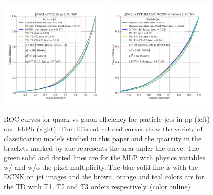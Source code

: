 \documentclass[notoc]{JHEP3}
\begin{document}
\begin{figure}[t]
	\centering
	\includegraphics[width=0.49\textwidth]{plots/JEWELPYTHIA_pp_2p76TeV_genLevel_QvsG.pdf}
	\includegraphics[width=0.49\textwidth]{plots/JEWELPYTHIA_PbPb_2p76TeV_genLevel_QvsG.pdf}
	\caption{ROC curves for quark vs gluon efficiency for particle jets in pp (left) and PbPb (right). The different colored curves show the variety of classification models studied in this paper and the quantity in the brackets marked by auc represents the area under the curve. The green solid and dotted lines are for the MLP with physics variables w/ and w/o the pixel multiplicity. The blue solid line is with the DCNN on jet images and the brown, orange and teal colors are for the TD with T1, T2 and T3 orders respectively. (color online)}
\label{fig:ROC_all}
\end{figure}
\end{document}
